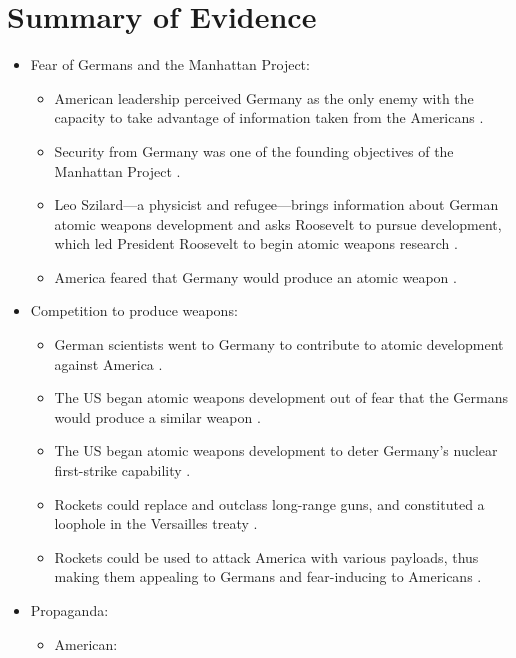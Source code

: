 \documentclass[a4paper,12pt]{article}
\begin{document}
    \section{Summary of Evidence}
        \begin{itemize}
            \item Fear of Germans and the Manhattan Project:
            \begin{itemize}
                \item American leadership perceived Germany as the only enemy with the capacity to take advantage of information taken from the Americans \cite[141]{grovesl}.
                \item Security from Germany was one of the founding objectives of the Manhattan Project \cite[140]{grovesl}.
                \item Leo Szilard---a physicist and refugee---brings information about German atomic weapons development and asks Roosevelt to pursue development, which led President Roosevelt to begin  atomic weapons research \cite[12]{norrism}.
                \item America feared that Germany would produce an atomic weapon \cite[136]{stoffm}.
            \end{itemize}
            \item Competition to produce weapons:
            \begin{itemize}
                \item German scientists went to Germany to contribute to atomic development against America \cite[6]{powerst}.
                \item The US began atomic weapons development out of fear that the Germans would produce a similar weapon \cite[88]{steinbergg}.
                \item The US began atomic weapons development to deter Germany's nuclear first-strike capability \cite[89]{steinbergg}.
                \item Rockets could replace and outclass long-range guns, and constituted a loophole in the Versailles treaty \cite[2]{neufeldm}.
                \item Rockets could be used to attack America with various payloads, thus making them appealing to Germans and fear-inducing to Americans \cite[157]{neufeldm}.
            \end{itemize}
            \item Propaganda:
            \begin{itemize}
                \item American:

\end{itemize}
\end{itemize}
\end{document}
